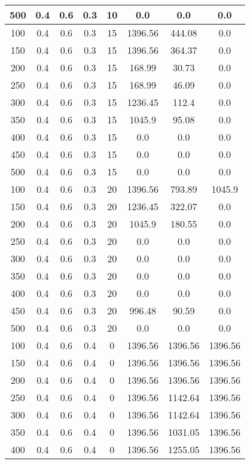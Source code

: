 \documentclass[a4paper, 12pt]{extreport}
\begin{document}
\begin{itemize}
\begin{longtable}{|c|c|c|c|c|c|c|c|}
			500 & 0.4 & 0.6 & 0.3 & 10 & 0.0 & 0.0 & 0.0 \\\hline
			100 & 0.4 & 0.6 & 0.3 & 15 & 1396.56 & 444.08 & 0.0 \\\hline
			150 & 0.4 & 0.6 & 0.3 & 15 & 1396.56 & 364.37 & 0.0 \\\hline
			200 & 0.4 & 0.6 & 0.3 & 15 & 168.99 & 30.73 & 0.0 \\\hline
			250 & 0.4 & 0.6 & 0.3 & 15 & 168.99 & 46.09 & 0.0 \\\hline
			300 & 0.4 & 0.6 & 0.3 & 15 & 1236.45 & 112.4 & 0.0 \\\hline
			350 & 0.4 & 0.6 & 0.3 & 15 & 1045.9 & 95.08 & 0.0 \\\hline
			400 & 0.4 & 0.6 & 0.3 & 15 & 0.0 & 0.0 & 0.0 \\\hline
			450 & 0.4 & 0.6 & 0.3 & 15 & 0.0 & 0.0 & 0.0 \\\hline
			500 & 0.4 & 0.6 & 0.3 & 15 & 0.0 & 0.0 & 0.0 \\\hline
			100 & 0.4 & 0.6 & 0.3 & 20 & 1396.56 & 793.89 & 1045.9 \\\hline
			150 & 0.4 & 0.6 & 0.3 & 20 & 1236.45 & 322.07 & 0.0 \\\hline
			200 & 0.4 & 0.6 & 0.3 & 20 & 1045.9 & 180.55 & 0.0 \\\hline
			250 & 0.4 & 0.6 & 0.3 & 20 & 0.0 & 0.0 & 0.0 \\\hline
			300 & 0.4 & 0.6 & 0.3 & 20 & 0.0 & 0.0 & 0.0 \\\hline
			350 & 0.4 & 0.6 & 0.3 & 20 & 0.0 & 0.0 & 0.0 \\\hline
			400 & 0.4 & 0.6 & 0.3 & 20 & 0.0 & 0.0 & 0.0 \\\hline
			450 & 0.4 & 0.6 & 0.3 & 20 & 996.48 & 90.59 & 0.0 \\\hline
			500 & 0.4 & 0.6 & 0.3 & 20 & 0.0 & 0.0 & 0.0 \\\hline
			100 & 0.4 & 0.6 & 0.4 & 0 & 1396.56 & 1396.56 & 1396.56 \\\hline
			150 & 0.4 & 0.6 & 0.4 & 0 & 1396.56 & 1396.56 & 1396.56 \\\hline
			200 & 0.4 & 0.6 & 0.4 & 0 & 1396.56 & 1396.56 & 1396.56 \\\hline
			250 & 0.4 & 0.6 & 0.4 & 0 & 1396.56 & 1142.64 & 1396.56 \\\hline
			300 & 0.4 & 0.6 & 0.4 & 0 & 1396.56 & 1142.64 & 1396.56 \\\hline
			350 & 0.4 & 0.6 & 0.4 & 0 & 1396.56 & 1031.05 & 1396.56 \\\hline
			400 & 0.4 & 0.6 & 0.4 & 0 & 1396.56 & 1255.05 & 1396.56 \\\hline

\end{longtable}
\end{itemize}
\end{document}
